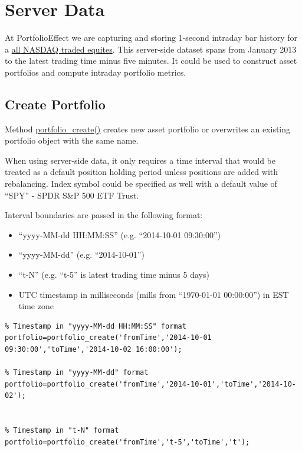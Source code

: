 \documentclass[letterpaper]{report}
\newcounter{N}
\begin{document}
\section{Server Data}
At PortfolioEffect we are capturing and storing 1-second intraday bar history for a 
\href{https://www.portfolioeffect.com/docs/symbology}{all NASDAQ traded equites}.
This server-side dataset spans from January 2013 to the latest trading time minus five minutes. 
It could be used to construct asset portfolios and compute intraday portfolio metrics.
\subsection {Create Portfolio}
Method
\href{https://www.portfolioeffect.com/docs/platform/quant/functions/general-functions/portfolio-create}{portfolio\_create()}
creates new asset portfolio or overwrites an existing portfolio object with the
same name. \par
When using server-side data, it only requires a time interval that would be
treated as a default position holding period unless positions are added with rebalancing.
Index symbol could be specified as well with a default value of ``SPY'' - SPDR
S\&P 500 ETF Trust.
\par
Interval boundaries are passed in the following format:
\begin{itemize} 
  \item ``yyyy-MM-dd HH:MM:SS'' (e.g. ``2014-10-01 09:30:00'')
  \item ``yyyy-MM-dd'' (e.g. ``2014-10-01'')
  \item ``t-N'' (e.g. ``t-5'' is latest trading time minus 5 days)
  \item UTC timestamp in milliseconds (mills from ``1970-01-01 00:00:00'') in EST
  time zone
\end{itemize}
\begin{lstlisting}
% Timestamp in "yyyy-MM-dd HH:MM:SS" format
portfolio=portfolio_create('fromTime','2014-10-01 09:30:00','toTime','2014-10-02 16:00:00');

% Timestamp in "yyyy-MM-dd" format
portfolio=portfolio_create('fromTime','2014-10-01','toTime','2014-10-02');


% Timestamp in "t-N" format
portfolio=portfolio_create('fromTime','t-5','toTime','t');
\end{lstlisting}
\end{document}
